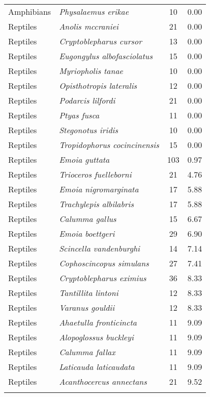 \begin{longtable}{l>{\itshape}lcc}
  Amphibians & Physalaemus erikae &  10 & 0.00 \\ 
  Reptiles & Anolis mccraniei &  21 & 0.00 \\ 
  Reptiles & Cryptoblepharus cursor &  13 & 0.00 \\ 
  Reptiles & Eugongylus albofasciolatus &  15 & 0.00 \\ 
  Reptiles & Myriopholis tanae &  10 & 0.00 \\ 
  Reptiles & Opisthotropis lateralis &  12 & 0.00 \\ 
  Reptiles & Podarcis lilfordi &  21 & 0.00 \\ 
  Reptiles & Ptyas fusca &  11 & 0.00 \\ 
  Reptiles & Stegonotus iridis &  10 & 0.00 \\ 
  Reptiles & Tropidophorus cocincinensis &  15 & 0.00 \\ 
  Reptiles & Emoia guttata & 103 & 0.97 \\ 
  Reptiles & Trioceros fuelleborni &  21 & 4.76 \\ 
  Reptiles & Emoia nigromarginata &  17 & 5.88 \\ 
  Reptiles & Trachylepis albilabris &  17 & 5.88 \\ 
  Reptiles & Calumma gallus &  15 & 6.67 \\ 
  Reptiles & Emoia boettgeri &  29 & 6.90 \\ 
  Reptiles & Scincella vandenburghi &  14 & 7.14 \\ 
  Reptiles & Cophoscincopus simulans &  27 & 7.41 \\ 
  Reptiles & Cryptoblepharus eximius &  36 & 8.33 \\ 
  Reptiles & Tantillita lintoni &  12 & 8.33 \\ 
  Reptiles & Varanus gouldii &  12 & 8.33 \\ 
  Reptiles & Ahaetulla fronticincta &  11 & 9.09 \\ 
  Reptiles & Alopoglossus buckleyi &  11 & 9.09 \\ 
  Reptiles & Calumma fallax &  11 & 9.09 \\ 
  Reptiles & Laticauda laticaudata &  11 & 9.09 \\ 
  Reptiles & Acanthocercus annectans &  21 & 9.52 \\ 
   \hline
\label{table_worst}
\end{longtable}
